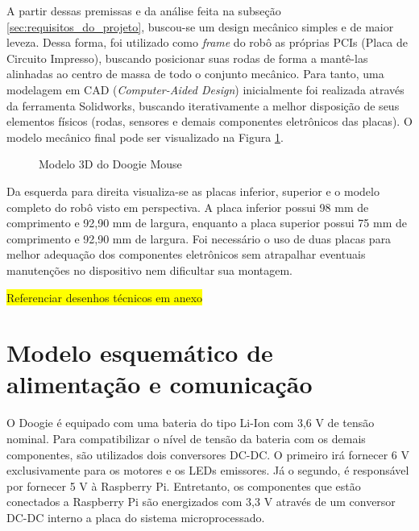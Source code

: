A partir dessas premissas e da análise feita na subseção \ref{sec:requisitos_do_projeto}, buscou-se um design mecânico simples e de maior leveza. Dessa forma, foi utilizado como \textit{frame} do robô as próprias PCIs (Placa de Circuito Impresso), buscando posicionar suas rodas de forma a mantê-las alinhadas ao centro de massa de todo o conjunto mecânico. Para tanto, uma modelagem em CAD (\textit{Computer-Aided Design}) inicialmente foi realizada através da ferramenta Solidworks, buscando iterativamente a melhor disposição de seus elementos físicos (rodas, sensores e demais componentes eletrônicos das placas).  O modelo mecânico final pode ser visualizado na Figura \ref{fig:doogie_boards_3d}.

\begin{figure}[H]
	\centering
	\caption{Modelo 3D do Doogie Mouse}
	\label{fig:doogie_boards_3d}
\end{figure}

Da esquerda para direita visualiza-se as placas inferior, superior e o modelo completo do robô visto em perspectiva. A placa inferior possui 98 mm de comprimento e 92,90 mm de largura, enquanto a placa superior possui 75 mm de comprimento e 92,90 mm de largura. Foi necessário o uso de duas placas para melhor adequação dos componentes eletrônicos sem atrapalhar eventuais manutenções no dispositivo nem dificultar sua montagem.

\colorbox{yellow}{Referenciar desenhos técnicos em anexo}

\section{Modelo esquemático de alimentação e comunicação}
\label{sec:arquitetura_eletrica_geral}
O Doogie é equipado com uma bateria do tipo Li-Ion com 3,6 V de tensão nominal. Para compatibilizar o nível de tensão da bateria com os demais componentes, são utilizados dois conversores DC-DC. O primeiro irá fornecer 6 V exclusivamente para os motores e os LEDs emissores. Já o segundo, é responsável por fornecer 5 V à Raspberry Pi. Entretanto, os componentes que estão conectados a Raspberry Pi são energizados com 3,3 V através de um conversor DC-DC interno a placa do sistema microprocessado.

